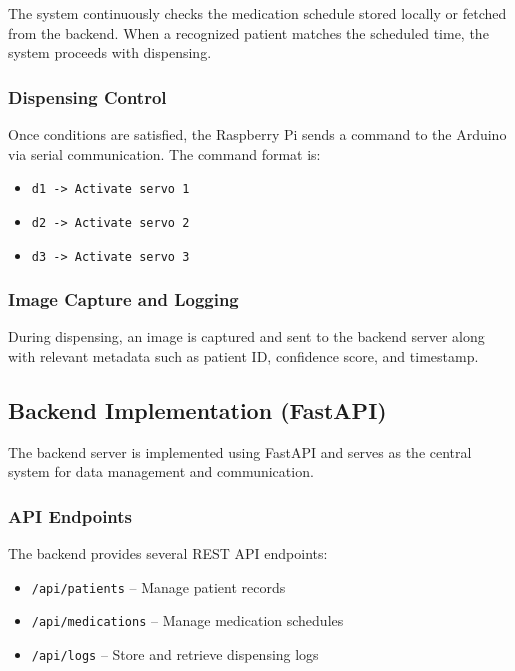The system continuously checks the medication schedule stored locally or fetched from the backend. When a recognized patient matches the scheduled time, the system proceeds with dispensing.

\subsubsection{Dispensing Control}

Once conditions are satisfied, the Raspberry Pi sends a command to the Arduino via serial communication. The command format is:

\begin{itemize}
\item \texttt{d1 -> Activate servo 1}
\item \texttt{d2 -> Activate servo 2}
\item \texttt{d3 -> Activate servo 3}
\end{itemize}

\subsubsection{Image Capture and Logging}

During dispensing, an image is captured and sent to the backend server along with relevant metadata such as patient ID, confidence score, and timestamp.

\subsection{Backend Implementation (FastAPI)}

The backend server is implemented using FastAPI and serves as the central system for data management and communication.

\subsubsection{API Endpoints}

The backend provides several REST API endpoints:

\begin{itemize}
    \item \texttt{/api/patients} – Manage patient records
    \item \texttt{/api/medications} – Manage medication schedules
    \item \texttt{/api/logs} – Store and retrieve dispensing logs
\end{itemize}


